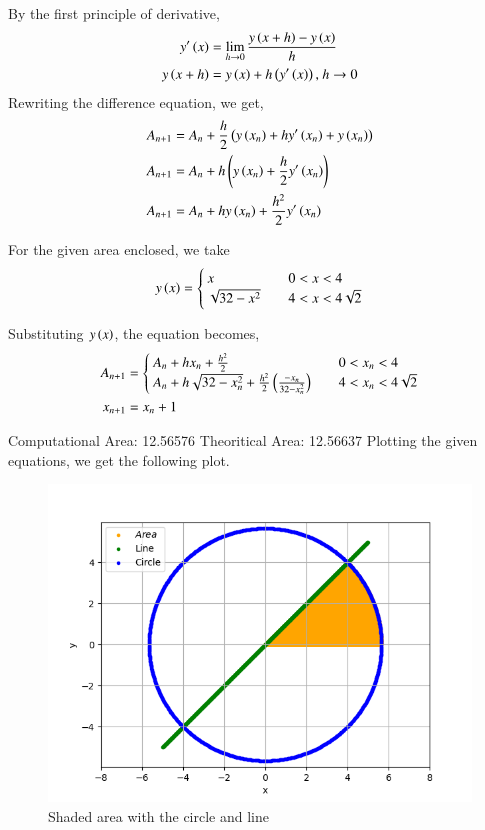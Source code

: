 \documentclass[journal]{IEEEtran}
\begin{document}
By the first principle of derivative,
\begin{align}
    y^{\prime}\left(x\right) &= \lim_{h\to0} \frac{y\left(x + h\right) - y\left(x\right)}{h}\\
    y\left(x + h\right) &= y\left(x\right) + h\left(y^{\prime}\left(x\right)\right) \text{, } h\to0
\end{align}
Rewriting the difference equation, we get,
\begin{align}
    A_{n + 1} &= A_n + \frac{h}{2}\left(y\left(x_n\right) + hy^{\prime}\left(x_n\right) + y\left(x_n\right)\right)\\
    A_{n + 1} &= A_n + h\left(y\left(x_n\right) + \frac{h}{2}y^{\prime}\left(x_n\right)\right)\\
    A_{n + 1} &= A_n + hy\left(x_n\right) + \frac{h^2}{2}y^{\prime}\left(x_n\right)
\end{align}

For the given area enclosed, we take
\begin{align}
    y\left(x\right) =
    \begin{cases}
        x & \quad 0 < x < 4\\
	    \sqrt{32 - x^2} & \quad 4 < x < 4\sqrt{2}
    \end{cases}
\end{align}

Substituting $y\left(x\right)$, the equation becomes,
\begin{align}
    A_{n + 1} &=
    \begin{cases}
        A_n + h x_n + \frac{h^2}{2} & \quad 0 < x_n < 4\\
	    A_n + h\sqrt{32 - x_n^2} + \frac{h^2}{2}\left(\frac{-x_n}{32 - x_n^2}\right) & \quad 4 < x_n < 4\sqrt{2}
    \end{cases}\\
    x_{n + 1} &= x_n + 1
\end{align}

Computational Area: 12.56576
\newline
Theoritical Area: 12.56637
\newline
Plotting the given equations, we get the following plot.

\begin{figure}[h!]
   \centering
   \includegraphics[width=0.7\columnwidth]{figs/graph.png}
    \caption{Shaded area with the circle and line}
   \label{label}
\end{figure}
\end{document}
